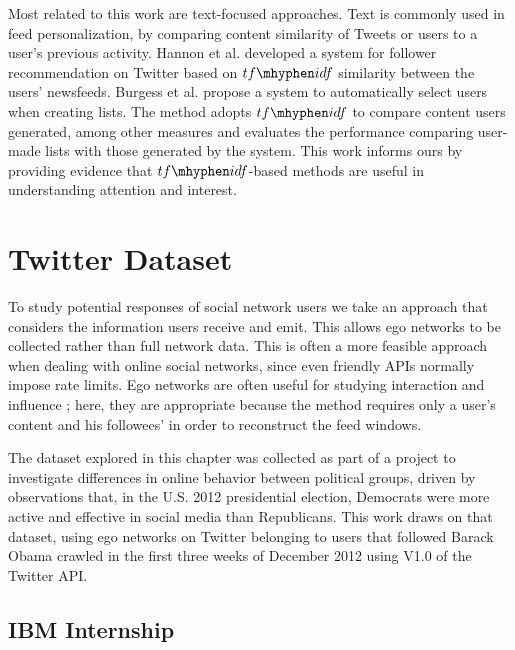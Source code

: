 Most related to this work are text-focused approaches.  Text is commonly used in feed personalization, by comparing content similarity of Tweets or users to a user's previous activity.  
Hannon et al. \cite{Hannon2011} developed a system for follower recommendation on Twitter based on $tf\mhyphen idf$ similarity between the users' newsfeeds. 
Burgess et al. \cite{Burgess2013} propose a system to automatically select users when creating lists. The method adopts $tf\mhyphen idf$ to compare content users generated, among other measures and evaluates the performance comparing user-made lists with those generated by the system.  This work informs ours by providing evidence that $tf\mhyphen idf$-based methods are useful in understanding attention and interest.

\section{Twitter Dataset}

To study potential responses of social network users we take an approach that considers the information users receive and emit. This allows ego networks to be collected rather than full network data.  
This is often a more feasible approach when dealing with online social networks, since even friendly APIs normally impose rate limits.  
Ego networks are often useful for studying interaction and influence \cite{Welser2011,Sharma2013}; here, they are appropriate because the method requires only a user's content and his followees' in order to reconstruct the feed windows.

The dataset explored in this chapter was collected as part of a project to investigate differences in online behavior between political groups, driven by observations that, in the U.S. 2012 presidential election, Democrats were more active and effective in social media than Republicans.  This work draws on that dataset, using ego networks on Twitter belonging to users that followed Barack Obama crawled in the first three weeks of December 2012 using V1.0 of the Twitter API.

\subsection{IBM Internship}

